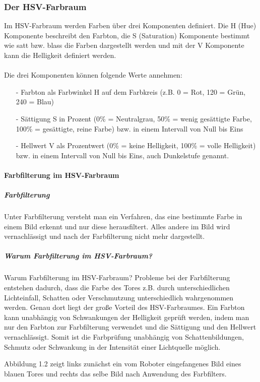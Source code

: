 \documentclass[a4paper,12pt]{article}
\begin{document}
\subsubsection{Der HSV-Farbraum}
Im HSV-Farbraum werden Farben über drei Komponenten definiert.
Die H (Hue) Komponente beschreibt den Farbton, die S (Saturation) Komponente bestimmt wie satt bzw. blass die Farben dargestellt werden und mit der V Komponente kann die Helligkeit definiert werden. \\
\\
Die drei Komponenten können folgende Werte annehmen:
\begin{itemize}
\item[-] Farbton als Farbwinkel H auf dem Farbkreis (z.B. 0 \degree = Rot, 120 \degree = Grün, 240 \degree = Blau)
\item[-] Sättigung S in Prozent (0\% = Neutralgrau, 50\% = wenig gesättigte Farbe, 100\% = gesättigte, reine Farbe) bzw. in einem Intervall von Null bis Eins
\item[-] Hellwert V als Prozentwert (0\% = keine Helligkeit, 100\% = volle Helligkeit) bzw. in einem Intervall von Null bis Eins, auch Dunkelstufe genannt.
\end{itemize}

\paragraph{Farbfilterung im HSV-Farbraum}
\subparagraph{Farbfilterung}
Unter Farbfilterung versteht man ein Verfahren, das eine bestimmte Farbe in einem Bild erkennt und nur diese herausfiltert. Alles andere im Bild wird vernachlässigt und nach der Farbfilterung nicht mehr dargestellt.
\subparagraph{Warum Farbfilterung im HSV-Farbraum?}
Warum Farbfilterung im HSV-Farbraum?
Probleme bei der Farbfilterung entstehen dadurch, dass die Farbe des Tores z.B. durch unterschiedlichen Lichteinfall, Schatten oder Verschmutzung unterschiedlich wahrgenommen werden. Genau dort liegt der große Vorteil des HSV-Farbraumes. Ein Farbton kann unabhängig von Schwankungen der Helligkeit geprüft werden, indem man nur den Farbton zur Farbfilterung verwendet und die Sättigung und den Hellwert vernachlässigt. Somit ist die Farbprüfung unabhängig von Schattenbildungen, Schmutz oder Schwankung in der Intensität einer Lichtquelle möglich.

Abbildung 1.2 zeigt links zunächst ein vom Roboter eingefangenes Bild eines blauen Tores und rechts das selbe Bild nach Anwendung des Farbfilters.
\end{document}
